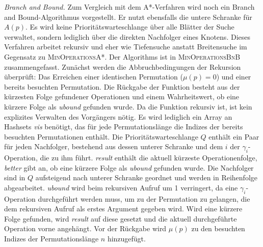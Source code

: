 \documentclass[a4paper, 10pt, ngerman]{article}
\begin{document}
\emph{{Branch and Bound.}} Zum Vergleich mit dem A*-Verfahren wird noch ein Branch and Bound-Algorithmus vorgestellt. Er nutzt ebensfalls die untere Schranke für $A(p)$. Es wird keine Prioritätswarteschlange über alle Blätter der Suche verwaltet, sondern lediglich über die direkten Nachfolger eines Knotens. Dieses Verfahren arbeitet rekursiv und eher wie Tiefensuche anstatt Breitensuche im Gegensatz zu \textsc{MinOperationsA*}. Der Algorithms ist in \textsc{MinOperationsBnB} zusammengefasst. Zunächst werden die Abbruchbedingungen der Rekursion überprüft: Das Erreichen einer identischen Permutation ($\mu(p) = 0$) und einer bereits besuchten Permutation. Die Rückgabe der Funktion besteht aus der kürzesten Folge gefundener Operationen und einem Wahrheitswert, ob eine kürzere Folge als \emph{ubound} gefunden wurde. Da die Funktion rekursiv ist, ist kein explizites Verwalten des Vorgängers nötig. Es wird lediglich ein Array an Hashsets \emph{vis} benötigt, das für jede Permutationslänge die Indizes der bereits besuchten Permutationen enthält. Die Prioritätswarteschlange $Q$ enthält ein Paar für jeden Nachfolger, bestehend aus dessen unterer Schranke und dem $i$ der $\gamma_i$-Operation, die zu ihm führt. \emph{result} enthält die aktuell kürzeste Operationenfolge, \emph{better} gibt an, ob eine kürzere Folge als \emph{ubound} gefunden wurde. Die Nachfolger sind in $Q$ aufsteigend nach unterer Schranke geordnet und werden in Reihenfolge abgearbeitet. \emph{ubound} wird beim rekursiven Aufruf um 1 verringert, da eine $\gamma_i$-Operation durchgeführt werden muss, um zu der Permutation zu gelangen, die dem rekursiven Aufruf als erstes Argument gegeben wird. Wird eine kürzere Folge gefunden, wird \emph{result} auf diese gesetzt und die aktuell durchgeführte Operation vorne angehängt. Vor der Rückgabe wird $\mu(p)$ zu den besuchten Indizes der Permutationslänge $n$ hinzugefügt.
\end{document}
